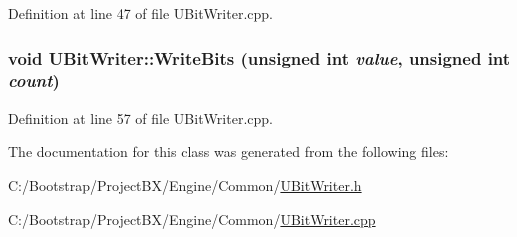 Definition at line 47 of file UBitWriter.cpp.\hypertarget{class_u_bit_writer_c13e9a7c145b428ff95d716658bea5bb}{
\subsubsection[{WriteBits}]{\setlength{\rightskip}{0pt plus 5cm}void UBitWriter::WriteBits (unsigned int {\em value}, \/  unsigned int {\em count})}}
\label{class_u_bit_writer_c13e9a7c145b428ff95d716658bea5bb}




Definition at line 57 of file UBitWriter.cpp.

The documentation for this class was generated from the following files:\begin{CompactItemize}
\item 
C:/Bootstrap/ProjectBX/Engine/Common/\hyperlink{_u_bit_writer_8h}{UBitWriter.h}\item 
C:/Bootstrap/ProjectBX/Engine/Common/\hyperlink{_u_bit_writer_8cpp}{UBitWriter.cpp}\end{CompactItemize}
